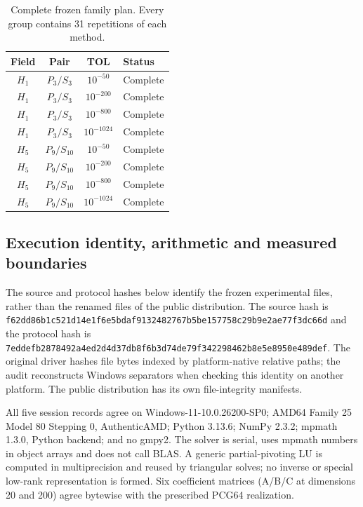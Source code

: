 \documentclass[11pt]{article}
\begin{document}
\begin{table}[htbp]\centering\small
\caption{Complete frozen family plan. Every group contains 31 repetitions of each method.}\label{tab:mp-coverage}
\begin{tabular}{cccl}\toprule
Field & Pair & TOL & Status\\\midrule
$H_{1}$ & $P_{3}/S_{3}$ & $10^{-50}$ & Complete\\
$H_{1}$ & $P_{3}/S_{3}$ & $10^{-200}$ & Complete\\
$H_{1}$ & $P_{3}/S_{3}$ & $10^{-800}$ & Complete\\
$H_{1}$ & $P_{3}/S_{3}$ & $10^{-1024}$ & Complete\\
$H_{5}$ & $P_{9}/S_{10}$ & $10^{-50}$ & Complete\\
$H_{5}$ & $P_{9}/S_{10}$ & $10^{-200}$ & Complete\\
$H_{5}$ & $P_{9}/S_{10}$ & $10^{-800}$ & Complete\\
$H_{5}$ & $P_{9}/S_{10}$ & $10^{-1024}$ & Complete\\
\bottomrule\end{tabular}\end{table}
\FloatBarrier
\subsection{Execution identity, arithmetic and measured boundaries}\label{subsec:mp-arithmetic}
The source and protocol hashes below identify the frozen experimental files, rather than the renamed files of the public distribution. The source hash is \texttt{f62dd86b}\allowbreak\texttt{1c521d14}\allowbreak\texttt{e1f6e5bd}\allowbreak\texttt{af913248}\allowbreak\texttt{2767b5be}\allowbreak\texttt{157758c2}\allowbreak\texttt{9b9e2ae7}\allowbreak\texttt{7f3dc66d} and the protocol hash is \texttt{7eddefb2}\allowbreak\texttt{878492a4}\allowbreak\texttt{ed2d4d37}\allowbreak\texttt{db8f6b3d}\allowbreak\texttt{74de79f3}\allowbreak\texttt{42298462}\allowbreak\texttt{b8e5e895}\allowbreak\texttt{0e489def}. The original driver hashes file bytes indexed by platform-native relative paths; the audit reconstructs Windows separators when checking this identity on another platform. The public distribution has its own file-integrity manifests.

All five session records agree on Windows-11-10.0.26200-SP0; AMD64 Family 25 Model 80 Stepping 0, AuthenticAMD; Python 3.13.6; NumPy 2.3.2; mpmath 1.3.0, Python backend; and no gmpy2. The solver is serial, uses mpmath numbers in object arrays and does not call BLAS. A generic partial-pivoting LU is computed in multiprecision and reused by triangular solves; no inverse or special low-rank representation is formed. Six coefficient matrices (A/B/C at dimensions 20 and 200) agree bytewise with the prescribed PCG64 realization.
\end{document}
